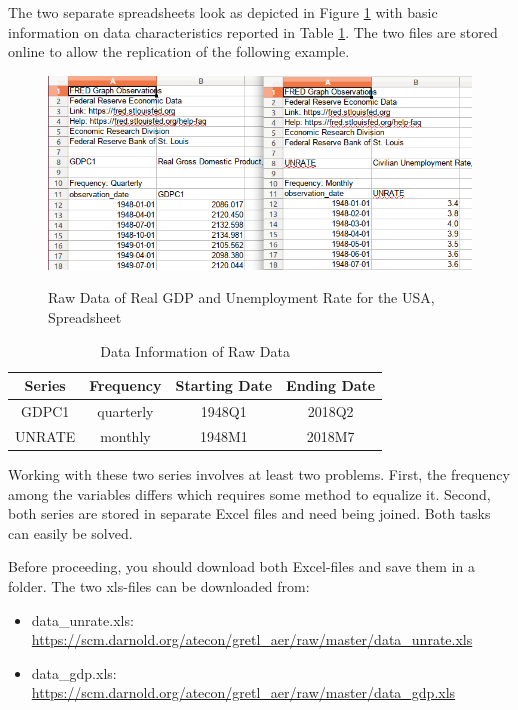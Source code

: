 \documentclass[11pt]{article}
\begin{document}
The two separate spreadsheets look as depicted in Figure \ref{fig:spread} with basic information on data characteristics reported in Table \ref{tab:datainfo}. The two files are stored online to allow the replication of the following example.

\begin{figure}[!h]
	\centering
	\caption{Raw Data of Real GDP and Unemployment Rate for the USA, Spreadsheet}
	\includegraphics[width=.6\textwidth]{../figures/data_spreadsheet}	
	\label{fig:spread}
\end{figure}


\begin{table}[!h]
	\centering
	\caption{Data Information of Raw Data}
	\footnotesize
	\begin{tabular}{cccc}
		\hline
		Series & Frequency & Starting Date & Ending Date \\ 
		\hline 
		GDPC1	& quarterly & 1948Q1 & 2018Q2 \\ 
		UNRATE	& monthly & 1948M1 & 2018M7 \\ 
		\hline 
	\end{tabular}	
	\label{tab:datainfo}
\end{table}

Working with these two series involves at least two problems. First, the frequency among the variables differs which requires some method to equalize it. %
Second, both series are stored in separate Excel files and need being joined. Both tasks can easily be solved.

Before proceeding, you should download both Excel-files and save them in a folder. The two xls-files can be downloaded from:
\begin{itemize}
	\item data\_unrate.xls: \url{https://scm.darnold.org/atecon/gretl_aer/raw/master/data_unrate.xls}
	\item data\_gdp.xls: \url{https://scm.darnold.org/atecon/gretl_aer/raw/master/data_gdp.xls}
\end{itemize}
\end{document}
